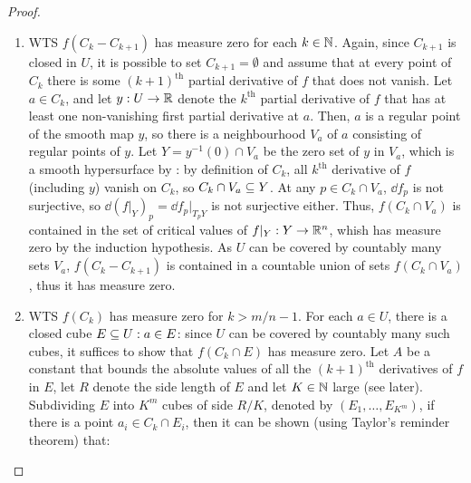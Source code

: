 \begin{proofbox}
\begin{proof}
\begin{enumerate}
        Since $ f(C \cap \overline{V}_a) $ is compact, by  it suffices to show that its intersection with the hyperplane $ y^1 = c $ has $ (n-1) $-dimensional measure zero. For $ c \in \R $, let $ B_c \equiv \{v \in \R^{m-1} : (c,v) \in \overline{V}_a\} $ and define $ f_c : B_c \ra \R^{n-1} $ as:
        \begin{equation*}
          f_c(v) = (f^2(c,v) , \dots , f^n(c,v))
        \end{equation*}
        Since $ f(c,v) = (c,f_c(v)) $, the critical values of $ f \vert_{\overline{V}_a} $ that lie in the hyperplane $ y^1 = c $ are of the form $ (c,w) $, with $ w $ critical value of $ f_c $. By the inductive hypothesis, the set of critical values of each $ f_c $ has $ (n-1) $-dimensional measure zero: thus, by , $ f(C \cap \overline{V}_a) $ has measure zero.
        As $ U $ is covered by countably many sets of the form $ \overline{V}_a $, $ f(C \cap U) $ is a countable union of sets of measure zero and thus has measure zero.
      \item WTS $ f(C_k - C_{k+1}) $ has measure zero for each $ k \in \mathbb{N} $. Again, since $ C_{k+1} $ is closed in $ U $, it is possible to set $ C_{k+1} = \emptyset $ and assume that at every point of $ C_k $ there is some $ (k+1)^\text{th} $ partial derivative of $ f $ that does not vanish. Let $ a \in C_k $, and let $ y : U \rightarrow \mathbb{R} $ denote the $ k^\text{th} $ partial derivative of $ f $ that has at least one non-vanishing first partial derivative at $ a $. Then, $ a $ is a regular point of the smooth map $ y $, so there is a neighbourhood $ V_a $ of $ a $ consisting of regular points of $ y $. Let $ Y = y^{-1}(0) \cap V_a $ be the zero set of $ y $ in $ V_a $, which is a smooth hypersurface by : by definition of $ C_k $, all $ k^\text{th} $ derivative of $ f $ (including $ y $) vanish on $ C_k $, so $ C_k \cap V_a \subseteq Y $. At any $ p \in C_k \cap V_a $, $ \dd f_p $ is not surjective, so $ \dd (f \vert_Y)_p = \dd f_p \vert_{T_pY} $ is not surjective either. Thus, $ f(C_k \cap V_a) $ is contained in the set of critical values of $ f \vert_Y : Y \rightarrow \mathbb{R}^n $, whish has measure zero by the induction hypothesis. As $ U $ can be covered by countably many sets $ V_a $, $ f(C_k - C_{k+1}) $ is contained in a countable union of sets $ f(C_k \cap V_a) $, thus it has measure zero.
      \item WTS $ f(C_k) $ has measure zero for $ k > m/n - 1 $. For each $ a \in U $, there is a closed cube $ E \subseteq U : a \in E $: since $ U $ can be covered by countably many such cubes, it suffices to show that $ f(C_k \cap E) $ has measure zero. Let $ A $ be a constant that bounds the absolute values of all the $ (k+1)^\text{th} $ derivatives of $ f $ in $ E $, let $ R $ denote the side length of $ E $ and let $ K \in \mathbb{N} $ large (see later). Subdividing $ E $ into $ K^m $ cubes of side $ R/K $, denoted by $ (E_1 , \dots , E_{K^m}) $, if there is a point $ a_i \in C_k \cap E_i $, then it can be shown (using Taylor's reminder theorem) that:

\end{enumerate}
\end{proof}
\end{proofbox}
